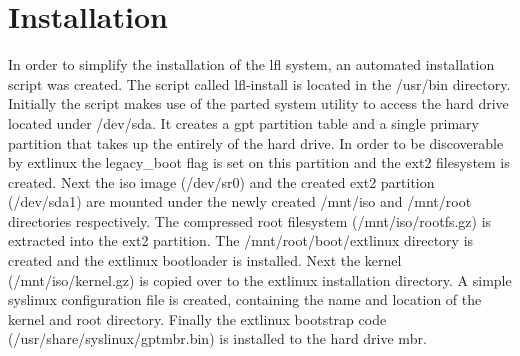 \section{Installation}\label{Installation}

In order to simplify the installation of the \gls{lfl} system, an automated installation script was created. The script called lfl-install is located in the /usr/bin directory. Initially the script makes use of the parted system utility to access the hard drive located under /dev/sda. It creates a gpt partition table and a single primary partition that takes up the entirely of the hard drive. In order to be discoverable by extlinux the legacy\_boot flag is set on this partition and the ext2 filesystem is created. Next the \gls{iso} image (/dev/sr0) and the created ext2 partition (/dev/sda1) are mounted under the newly created /mnt/iso and /mnt/root directories respectively. The compressed root filesystem (/mnt/iso/rootfs.gz) is extracted into the ext2 partition. The /mnt/root/boot/extlinux directory is created and the extlinux bootloader is installed. Next the kernel (/mnt/iso/kernel.gz) is copied over to the extlinux installation directory. A simple syslinux configuration file is created, containing the name and location of the kernel and root directory. Finally the extlinux bootstrap code (/usr/share/syslinux/gptmbr.bin) is installed to the hard drive mbr.
